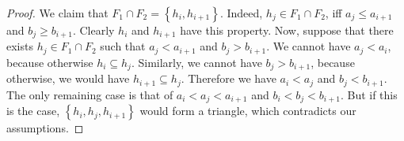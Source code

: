 \documentclass{article}
\theoremstyle{definition}
\begin{document}
\begin{proof}
        We claim that $F_1 \cap F_2 = 
        \left\{h_{i}, h_{i+1}\right\}$.
        Indeed, $h_{j} \in 
        F_1 \cap F_2$, 
        iff $a_{j} \leq a_{i+1}$ 
        and $b_{j} \geq b_{i+1}$.
        Clearly $h_{i}$ and
        $h_{i+1}$ have this
        property.
        Now, suppose that there
        exists $h_{j} \in F_1 \cap F_2$
        such that $a_{j} < a_{i+1}$
        and $b_{j} > b_{i+1}$.
        We cannot have $a_{j} < a_{i}$,
        because otherwise $h_{i} \subseteq h_{j}$.
        Similarly, we cannot have $b_{j} > b_{i+1}$,
        because otherwise, we would
        have $h_{i+1} \subseteq h_{j}$.
        Therefore we have $a_{i} < a_{j}$ 
        and $b_{j} < b_{i+1}$.
        The only remaining case is
        that of $a_{i} < a_{j} < a_{i+1}$ 
        and $b_{i} < b_{j} < b_{i+1}$.
        But if this is the case,
        $\left\{h_{i}, h_{j}, h_{i+1}\right\}$ would
        form a triangle, which
        contradicts our assumptions.
        

\end{proof}
\end{document}

